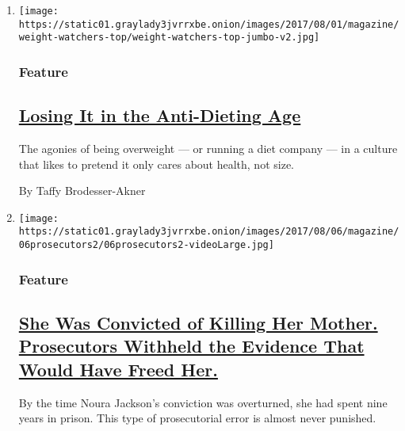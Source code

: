 \begin{enumerate}
\def\labelenumi{\arabic{enumi}.}
\item
  \texttt{[image: https://static01.graylady3jvrrxbe.onion/images/2017/08/01/magazine/weight-watchers-top/weight-watchers-top-jumbo-v2.jpg]}

  \hypertarget{feature}{%
  \subsubsection{Feature}\label{feature}}

  \hypertarget{losing-it-in-the-anti-dieting-age}{%
  \subsection{\texorpdfstring{\href{/2017/08/02/magazine/weight-watchers-oprah-losing-it-in-the-anti-dieting-age.html}{Losing
  It in the Anti-Dieting
  Age}}{Losing It in the Anti-Dieting Age}}\label{losing-it-in-the-anti-dieting-age}}

  The agonies of being overweight --- or running a diet company --- in a
  culture that likes to pretend it only cares about health, not size.

  By Taffy Brodesser-Akner
\item
  \texttt{[image: https://static01.graylady3jvrrxbe.onion/images/2017/08/06/magazine/06prosecutors2/06prosecutors2-videoLarge.jpg]}

  \hypertarget{feature-1}{%
  \subsubsection{Feature}\label{feature-1}}

  \hypertarget{she-was-convicted-of-killing-her-mother-prosecutors-withheld-the-evidence-that-would-have-freed-her}{%
  \subsection{\texorpdfstring{\href{/2017/08/01/magazine/she-was-convicted-of-killing-her-mother-prosecutors-withheld-the-evidence-that-would-have-freed-her.html}{She
  Was Convicted of Killing Her Mother. Prosecutors Withheld the Evidence
  That Would Have Freed
  Her.}}{She Was Convicted of Killing Her Mother. Prosecutors Withheld the Evidence That Would Have Freed Her.}}\label{she-was-convicted-of-killing-her-mother-prosecutors-withheld-the-evidence-that-would-have-freed-her}}

  By the time Noura Jackson's conviction was overturned, she had spent
  nine years in prison. This type of prosecutorial error is almost never
  punished.


\end{enumerate}
